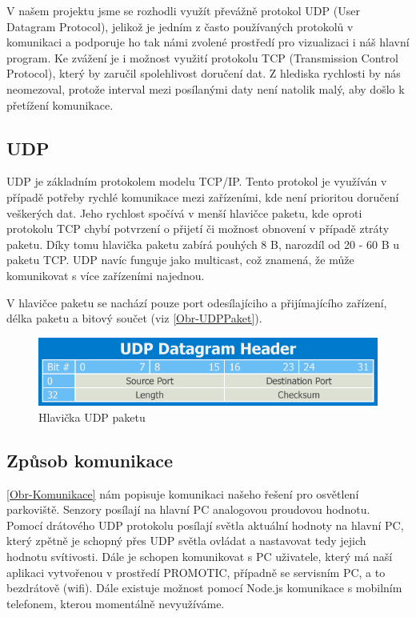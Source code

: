 V našem projektu jsme se rozhodli využít převážně protokol UDP (User Datagram Protocol), jelikož je jedním z často používaných protokolů v komunikaci a podporuje ho tak námi zvolené prostředí pro vizualizaci i náš hlavní program. Ke zvážení je i možnost využití protokolu TCP (Transmission Control Protocol), který by zaručil spolehlivost doručení dat. Z hlediska rychlosti by nás neomezoval, protože interval mezi posílanými daty není natolik malý, aby došlo k přetížení komunikace. \parencite{TCP_UDP} \parencite{UDP}

\subsection{UDP}

 UDP je základním protokolem modelu TCP/IP. Tento protokol je využíván v případě potřeby rychlé komunikace mezi zařízeními, kde není prioritou doručení veškerých dat. Jeho rychlost spočívá v menší hlavičce paketu, kde oproti protokolu TCP chybí potvrzení o přijetí či možnost obnovení v případě ztráty paketu. Díky tomu hlavička paketu zabírá pouhých 8 B, narozdíl od 20 - 60 B u paketu TCP. UDP navíc funguje jako multicast, což znamená, že může komunikovat s více zařízeními najednou.\parencite{TCP_UDP} \parencite{UDP}

V hlavičce paketu se nachází pouze port odesílajíciho a přijímajícího zařízení, délka paketu a bitový součet (viz \autoref{Obr-UDPPaket}). \parencite{TCP_UDP} \parencite{UDP}

\begin{figure}[H]
    \centering\includegraphics[width=.8\textwidth]{Figures/UDPPaket.png}   
    \caption{Hlavička UDP paketu}
    \label{Obr-UDPPaket}
\end{figure}

\subsection{Způsob komunikace}

\autoref{Obr-Komunikace} nám popisuje komunikaci našeho řešení pro osvětlení parkoviště. Senzory posílají na hlavní PC analogovou proudovou hodnotu. Pomocí drátového UDP protokolu posílají světla aktuální hodnoty na hlavní PC, který zpětně je schopný přes UDP světla ovládat a nastavovat tedy jejich hodnotu svítivosti. Dále je schopen komunikovat s PC uživatele, který má naší aplikaci vytvořenou v prostředí PROMOTIC, případně se servisním PC, a to bezdrátově (wifi). Dále existuje možnost pomocí Node.js komunikace s mobilním telefonem, kterou momentálně nevyužíváme.

